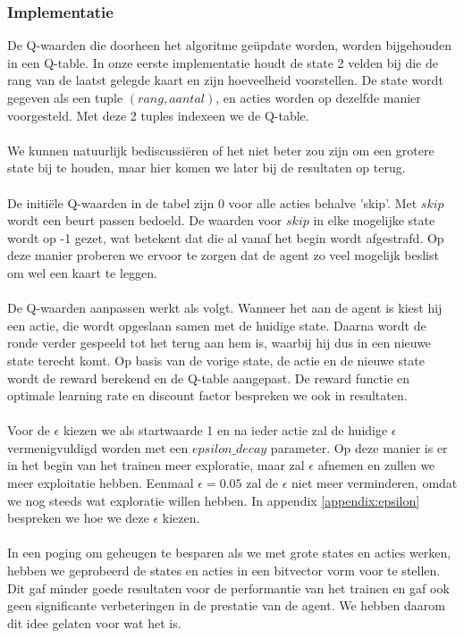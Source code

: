 \documentclass[11pt]{article}
\begin{document}
\subsubsection{Implementatie}
De Q-waarden die doorheen het algoritme geüpdate worden, worden bijgehouden in een Q-table. In onze eerste implementatie houdt de state 2 velden bij die de rang van de laatst gelegde kaart en zijn hoeveelheid voorstellen. De state wordt gegeven als een tuple $(rang, aantal)$, en acties worden op dezelfde manier voorgesteld. Met deze 2 tuples indexeen we de Q-table. \\\\
We kunnen natuurlijk bediscussiëren of het niet beter zou zijn om een grotere state bij te houden, maar hier komen we later bij de resultaten op terug.\\\\
De initiële Q-waarden in de tabel zijn 0 voor alle acties behalve 'skip'. Met $skip$ wordt een beurt passen bedoeld. De waarden voor $skip$ in elke mogelijke state wordt op -1 gezet, wat betekent dat die al vanaf het begin wordt afgestrafd. Op deze manier proberen we ervoor te zorgen dat de agent zo veel mogelijk beslist om wel een kaart te leggen. \\\\
De Q-waarden aanpassen werkt als volgt. Wanneer het aan de agent is kiest hij een actie, die wordt opgeslaan samen met de huidige state. Daarna wordt de ronde verder gespeeld tot het terug aan hem is, waarbij hij dus in een nieuwe state terecht komt. Op basis van de vorige state, de actie en de nieuwe state wordt de reward berekend en de Q-table aangepast. De reward functie en optimale learning rate en discount factor bespreken we ook in resultaten. \\\\
Voor de $\epsilon$ kiezen we als startwaarde 1 en na ieder actie zal de huidige $\epsilon$ vermenigvuldigd worden met een $epsilon\_decay$ parameter. Op deze manier is er in het begin van het trainen meer exploratie, maar zal $\epsilon$ afnemen en zullen we meer exploitatie hebben. Eenmaal $\epsilon = 0.05$ zal de $\epsilon$ niet meer verminderen, omdat we nog steeds wat exploratie willen hebben. In appendix \ref{appendix:epsilon} bespreken we hoe we deze $\epsilon$ kiezen.\\\\
In een poging om geheugen te besparen als we met grote states en acties werken, hebben we geprobeerd de states en acties in een bitvector vorm voor te stellen. Dit gaf minder goede resultaten voor de performantie van het trainen en gaf ook geen significante verbeteringen in de prestatie van de agent. We hebben daarom dit idee gelaten voor wat het is.
\end{document}
